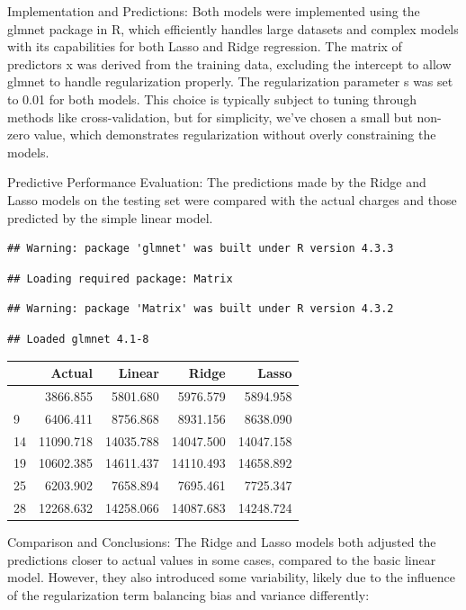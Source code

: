 \documentclass[
  12pt,
]{article}
\begin{document}
Implementation and Predictions: Both models were implemented using the
glmnet package in R, which efficiently handles large datasets and
complex models with its capabilities for both Lasso and Ridge
regression. The matrix of predictors x was derived from the training
data, excluding the intercept to allow glmnet to handle regularization
properly. The regularization parameter s was set to 0.01 for both
models. This choice is typically subject to tuning through methods like
cross-validation, but for simplicity, we've chosen a small but non-zero
value, which demonstrates regularization without overly constraining the
models.

Predictive Performance Evaluation: The predictions made by the Ridge and
Lasso models on the testing set were compared with the actual charges
and those predicted by the simple linear model.

\begin{verbatim}
## Warning: package 'glmnet' was built under R version 4.3.3
\end{verbatim}

\begin{verbatim}
## Loading required package: Matrix
\end{verbatim}

\begin{verbatim}
## Warning: package 'Matrix' was built under R version 4.3.2
\end{verbatim}

\begin{verbatim}
## Loaded glmnet 4.1-8
\end{verbatim}

\begin{longtable}[]{@{}lrrrr@{}}
\toprule\noalign{}
& Actual & Linear & Ridge & Lasso \\
\midrule\noalign{}
\endhead
\bottomrule\noalign{}
\endlastfoot
5 & 3866.855 & 5801.680 & 5976.579 & 5894.958 \\
9 & 6406.411 & 8756.868 & 8931.156 & 8638.090 \\
14 & 11090.718 & 14035.788 & 14047.500 & 14047.158 \\
19 & 10602.385 & 14611.437 & 14110.493 & 14658.892 \\
25 & 6203.902 & 7658.894 & 7695.461 & 7725.347 \\
28 & 12268.632 & 14258.066 & 14087.683 & 14248.724 \\
\end{longtable}

Comparison and Conclusions: The Ridge and Lasso models both adjusted the
predictions closer to actual values in some cases, compared to the basic
linear model. However, they also introduced some variability, likely due
to the influence of the regularization term balancing bias and variance
differently:
\end{document}
